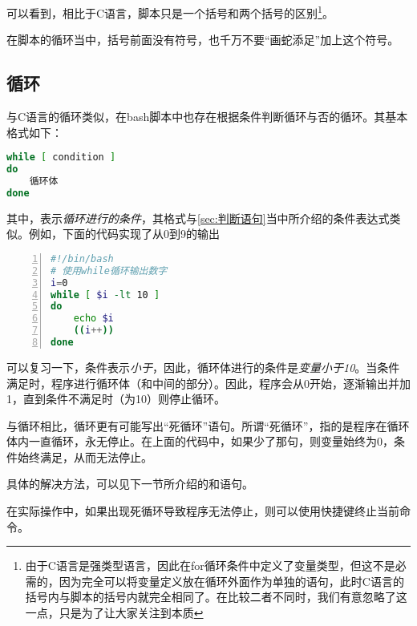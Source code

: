 可以看到，相比于C语言，脚本只是一个括号和两个括号的区别\footnote{由于C语言是强类型语言，因此在for循环条件中定义了变量类型，但这不是必需的，因为完全可以将变量定义放在循环外面作为单独的语句，此时C语言的括号内与脚本的括号内就完全相同了。在比较二者不同时，我们有意忽略了这一点，只是为了让大家关注到本质}。

\begin{attention}
    在脚本的循环当中，括号前面没有\code{\$}符号，也千万不要“画蛇添足”加上这个符号。
\end{attention}



\subsection{循环}\label{subsec:循环-while循环}

与C语言的循环类似，在bash脚本中也存在根据条件判断循环与否的循环。其基本格式如下：

\begin{lstlisting}[language=bash]
while [ condition ]
do
    循环体
done
\end{lstlisting}

其中，表示\emph{循环进行的条件}，其格式与\ref{sec:判断语句}当中所介绍的条件表达式类似。例如，下面的代码实现了从0到9的输出

\begin{lstlisting}[language=bash,numbers=left,caption={while\_example}]
#!/bin/bash
# 使用while循环输出数字
i=0
while [ $i -lt 10 ]
do
    echo $i
    ((i++))
done
\end{lstlisting}

可以复习一下，条件表示\emph{小于}，因此，循环体进行的条件是\emph{变量小于10}。当条件满足时，程序进行循环体（和中间的部分）。因此，程序会从0开始，逐渐输出并加1，直到条件不满足时（为10）则停止循环。

\begin{attention}
    与循环相比，循环更有可能写出“死循环”语句。所谓“死循环”，指的是程序在循环体内一直循环，永无停止。在上面的代码中，如果少了那句，则变量始终为0，条件始终满足，从而无法停止。

    具体的解决方法，可以见下一节所介绍的和语句。

    在实际操作中，如果出现死循环导致程序无法停止，则可以使用快捷键终止当前命令。
\end{attention}

